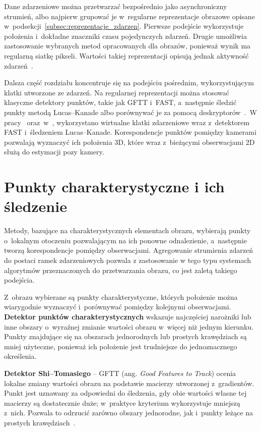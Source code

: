 Dane zdarzeniowe można przetwarzać bezpośrednio jako asynchroniczny strumień, albo najpierw grupować je w~regularne reprezentacje obrazowe opisane w~podsekcji~\ref{subsec:reprezentacje_zdarzen}. Pierwsze podejście wykorzystuje położenia i~dokładne znaczniki czasu pojedynczych zdarzeń. Drugie umożliwia zastosowanie wybranych metod opracowanych dla obrazów, ponieważ wynik ma regularną siatkę pikseli. Wartości takiej reprezentacji opisują jednak aktywność zdarzeń~\cite{gallego2022event,huang2026eventbased}.

Dalsza część rozdziału koncentruje się na podejściu pośrednim, wykorzystującym klatki utworzone ze zdarzeń. Na regularnej reprezentacji można stosować klasyczne detektory punktów, takie jak GFTT i~FAST, a~następnie śledzić punkty metodą Lucas--Kanade albo porównywać je za pomocą deskryptorów~\cite{shi1994good,rosten2006fast,lucas1981iterative}.~W pracy~\cite{rebecq2017eventvio} oraz~w~\cite{vidal2018ultimate}, wykorzystano wirtualne klatki zdarzeniowe wraz z~detektorem FAST i~śledzeniem Lucas--Kanade. Korespondencje punktów pomiędzy kamerami pozwalają wyznaczyć ich położenia 3D, które wraz z~bieżącymi obserwacjami 2D służą do estymacji pozy kamery.

\section{Punkty charakterystyczne i ich śledzenie}
\label{sec:punkty_charakterystyczne}
\label{subsec:sledzenie_cech}

Metody, bazujące na charakterystycznych elementach obrazu, wybierają punkty o~lokalnym otoczeniu pozwalającym na ich ponowne odnalezienie, a~następnie tworzą korespondencje pomiędzy obserwacjami. Agregowanie strumienia zdarzeń do postaci ramek zdarzeniowych pozwala z zastosowanie w tego typu systemach algorytmów przeznaczonych do przetwarzania obrazu, co jest zaletą takiego podejścia.

Z~obrazu wybierane są punkty charakterystyczne, których położenie można wiarygodnie wyznaczyć i~porównywać pomiędzy kolejnymi obserwacjami. \textbf{Detektor punktów charakterystycznych} wskazuje najczęściej narożniki lub inne obszary o~wyraźnej zmianie wartości obrazu w~więcej niż jednym kierunku. Punkty znajdujące się na obszarach jednorodnych lub prostych krawędziach są mniej użyteczne, ponieważ ich położenie jest trudniejsze do jednoznacznego określenia.

\textbf{Detektor Shi--Tomasiego} -- GFTT (ang. \textit{Good Features to Track}) ocenia lokalne zmiany wartości obrazu na podstawie macierzy utworzonej z~gradientów. Punkt jest uznawany za odpowiedni do śledzenia, gdy obie wartości własne tej macierzy są dostatecznie duże; w~praktyce kryterium wykorzystuje mniejszą z~nich. Pozwala to odrzucić zarówno obszary jednorodne, jak i~punkty leżące na prostych krawędziach~\cite{shi1994good}.

